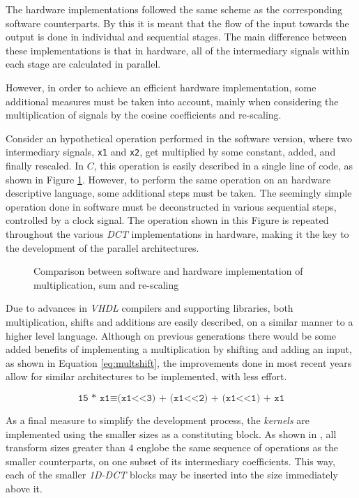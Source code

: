 The hardware implementations followed the same scheme as the corresponding software counterparts. By this it is meant that the flow of the input towards the output is done in individual and sequential stages. The main difference between these implementations is that in hardware, all of the intermediary signals within each stage are calculated in parallel. 

However, in order to achieve an efficient hardware implementation, some additional measures must be taken into account, mainly when considering the multiplication of signals by the cosine coefficients and re-scaling.

Consider an hypothetical operation performed in the software version, where two intermediary signals, \texttt{x1} and \texttt{x2}, get multiplied by some constant, added, and finally rescaled. In $C$, this operation is easily described in a single line of code, as shown in Figure \ref{fig:hardsoft}. However, to perform the same operation on an hardware descriptive language, some additional steps must be taken. The seemingly simple operation done in software must be deconstructed in various sequential steps, controlled by a clock signal. The operation shown in this Figure is repeated throughout the various \emph{DCT} implementations in hardware, making it the key to the development of the parallel architectures.

\begin{figure}[!htbp]
    \centering
    
    \caption{Comparison between software and hardware implementation of multiplication, sum and re-scaling}
    \label{fig:hardsoft}
\end{figure}

Due to advances in \emph{VHDL} compilers and supporting libraries, both multiplication, shifts and additions are easily described, on a similar manner to a higher level language. Although on previous generations there would be some added benefits of implementing a multiplication by shifting and adding an input, as shown in Equation \ref{eq:multshift}, the improvements done in most recent years allow for similar architectures to be implemented, with less effort.

\begin{equation} \label{eq:multshift}
    \texttt{15 * x1} \equiv \texttt{(x1<<3) + (x1<<2) + (x1<<1) + x1}
\end{equation}

As a final measure to simplify the development process, the \emph{kernels} are implemented using the smaller sizes as a constituting block. As shown in \cite{wen-hsiungchenFastComputationalAlgorithm1977}, all transform sizes greater than $4$ englobe the same sequence of operations as the smaller counterparts, on one subset of its intermediary coefficients. This way, each of the smaller \emph{1D-DCT} blocks may be inserted into the size immediately above it.

